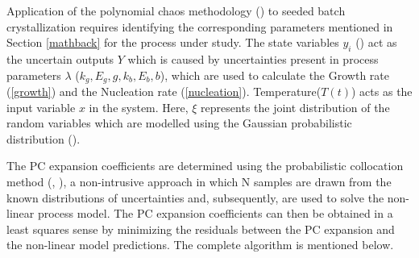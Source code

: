\documentclass[3p,times,authoryear]{elsarticle}
\begin{document}
Application of the polynomial chaos methodology (\cite{streif2014stochastic}) to seeded batch crystallization requires identifying the corresponding parameters mentioned in Section \ref{mathback} for the process under study. The state variables $y_{i}$ () act as the uncertain outputs $Y$ which is caused by uncertainties present in process parameters $\lambda$ ($k_{g}, E_{g}, g, k_{b}, E_{b}, b$), which are used to calculate the Growth rate (\ref{growth}) and the Nucleation rate (\ref{nucleation}). Temperature($T(t)$) acts as the input variable $x$ in the system. Here, $\xi$ represents the joint distribution of the random variables which are modelled using the Gaussian probabilistic distribution (\cite{yenkie}). 
\par
The PC expansion coefficients are determined using the probabilistic collocation method (\cite{mesbah2014active}, \cite{nagy}), a non-intrusive approach in which N samples are drawn from the known distributions of uncertainties and, subsequently, are used to solve the non-linear process model. The PC expansion coefficients can then be obtained in a least squares sense by minimizing the residuals between the PC expansion and the non-linear model predictions. The complete algorithm is mentioned below.
\end{document}

